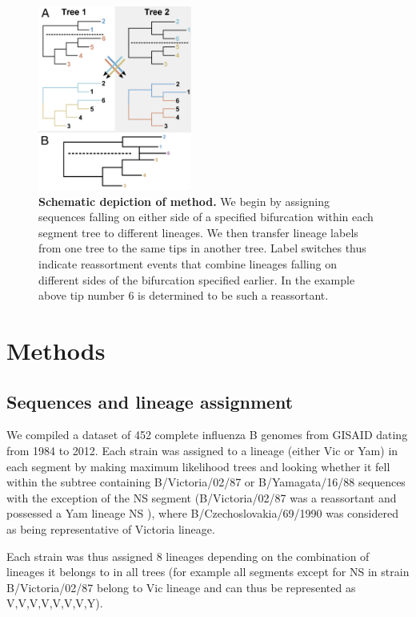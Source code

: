 \documentclass[11pt,oneside,letterpaper]{article}
\begin{document}
\begin{figure}[h]
 \centering		
	\includegraphics[width=0.45\textwidth]{figures/TreeFigure2}
	\caption{\textbf{Schematic depiction of method.}
We begin by assigning sequences falling on either side of a specified bifurcation within each segment tree to different lineages.
We then transfer lineage labels from one tree to the same tips in another tree.
Label switches thus indicate reassortment events that combine lineages falling on different sides of the bifurcation specified earlier.
In the example above tip number 6 is determined to be such a reassortant.}
	\label{methodFig}
\end{figure}

\section*{Methods}

\subsection*{Sequences and lineage assignment}

We compiled a dataset of 452 complete influenza B genomes from GISAID \cite{GISAID} dating from 1984 to 2012. 
Each strain was assigned to a lineage (either Vic or Yam) in each segment by making maximum likelihood trees and looking whether it fell within the subtree containing B/Victoria/02/87 or B/Yamagata/16/88 sequences with the exception of the NS segment (B/Victoria/02/87 was a reassortant and possessed a Yam lineage NS \cite{lindstrom1999}), where B/Czechoslovakia/69/1990 was considered as being representative of Victoria lineage.

Each strain was thus assigned 8 lineages depending on the combination of lineages it belongs to in all trees (for example all segments except for NS in strain B/Victoria/02/87 belong to Vic lineage and can thus be represented as V,V,V,V,V,V,V,Y). 
\end{document}
